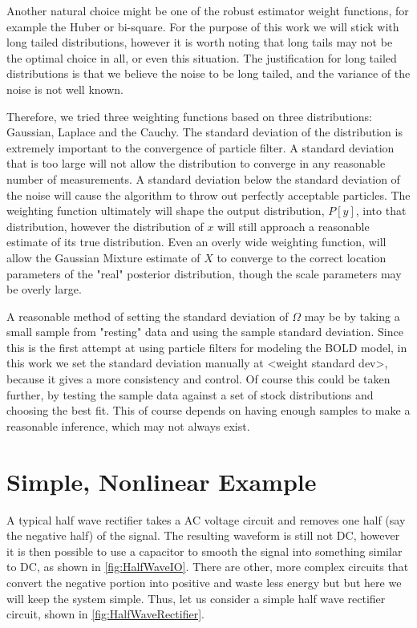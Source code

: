 Another natural choice might be one of the robust estimator weight functions, for
example the Huber or bi-square. For the purpose of this work we will stick
with long tailed distributions, however it is worth noting that long tails
may not be the optimal choice in all, or even this situation. The justification
for long tailed distributions is that we believe the noise to be long tailed,
and the variance of the noise is not well known.

Therefore, we tried three weighting functions based on three distributions: Gaussian, 
Laplace and the Cauchy. The standard deviation of the distribution is extremely
important to the convergence of particle filter. A standard deviation that is 
too large will not allow the distribution to converge in any reasonable number of 
measurements. A standard deviation below the standard deviation of the noise 
will cause the algorithm to throw out perfectly acceptable particles. 
The weighting function ultimately will shape the output distribution, $P[y]$, into that
distribution, however the distribution of $x$ will still approach a reasonable
estimate of its true distribution. Even an overly wide weighting function, will
allow the Gaussian Mixture estimate of $X$ to converge to the correct location 
parameters of the "real" posterior distribution, though the scale parameters may 
be overly large.

A reasonable method of setting the standard deviation of $\Omega$ may be by 
taking a small sample from "resting" data and using the sample standard deviation.
Since this is the first attempt at using particle filters for modeling the 
BOLD model, in this work we set the standard deviation manually at <weight standard dev>,
because it gives a more consistency and control. Of course this could be taken
further, by testing the sample data against a set of stock distributions
and choosing the best fit. This of course depends on having enough samples
to make a reasonable inference, which may not always exist. 

\section{Simple, Nonlinear Example}
A typical half wave rectifier takes a AC voltage circuit and removes
one half (say the negative half) of the signal. The resulting waveform
is still not DC, however it is then possible to use a capacitor to 
smooth the signal into something similar to DC, as shown in \autoref{fig:HalfWaveIO}.
There are other, more
complex circuits that convert the negative portion into positive and
waste less energy but but here we will keep the system simple.
Thus, let us consider a simple half wave rectifier circuit, shown in 
\autoref{fig:HalfWaveRectifier}.

